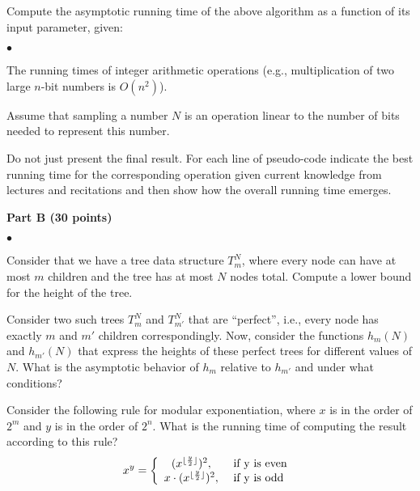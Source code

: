 \documentclass{article}
\newenvironment{myitem}{\begin{list}{$\bullet$}
{\setlength{\itemsep}{-0pt}
\setlength{\topsep}{0pt}
\setlength{\labelwidth}{0pt}
\setlength{\leftmargin}{10pt}
\setlength{\parsep}{-0pt}
\setlength{\itemsep}{0pt}
\setlength{\partopsep}{0pt}}}%
{\end{list}}
\begin{document}
 Compute the asymptotic running time of the
above algorithm as a function of its input parameter, given:

\begin{myitem}
\item The running times of integer arithmetic operations (e.g.,
  multiplication of two large $n$-bit numbers is $O(n^2)$).
\item Assume that sampling a number $N$ is an operation linear to the
  number of bits needed to represent this number.
\end{myitem}

\noindent Do not just present the final result. For each line of
pseudo-code indicate the best running time for the corresponding
operation given current knowledge from lectures and recitations and
then show how the overall running time emerges.\\

\begin{center}
{\bf Part B (30 points)}
\end{center}

\begin{myitem}
\item Consider that we have a tree data structure $T_m^N$, where every
  node can have at most $m$ children and the tree has at most $N$
  nodes total. Compute a lower bound for the height of the tree.\\

\item Consider two such trees $T_m^N$ and $T_{m'}^N$ that are
  ``perfect'', i.e., every node has exactly $m$ and $m'$ children
  correspondingly. Now, consider the functions $h_m(N)$ and
  $h_{m'}(N)$ that express the heights of these perfect trees for
  different values of $N$. What is the asymptotic behavior of $h_m$
  relative to $h_{m'}$ and under what conditions?\\

\item Consider the following rule for modular exponentiation, where
  $x$ is in the order of $2^m$ and $y$ is in the order of $2^n$. What
  is the running time of computing the result according to this rule?
$$x^y = \left\{
\begin{array}{c l}     
    (x ^{\lfloor \frac{y}{2} \rfloor} )^2,  & \textrm{ if y is even }\\
    x \cdot (x^{\lfloor \frac{y}{2} \rfloor} )^2, & \textrm{ if y is odd}
\end{array}\right.$$
\end{myitem}
\end{document}
